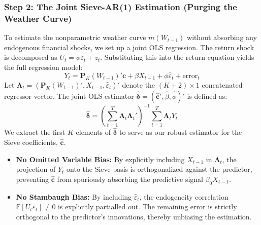 \documentclass{article}
\begin{document}
\subsubsection*{Step 2: The Joint Sieve-AR(1) Estimation (Purging the Weather Curve)}
To estimate the nonparametric weather curve $m(W_{t-1})$ without absorbing any endogenous financial shocks, we set up a joint OLS regression. The return shock is decomposed as $U_t = \phi \varepsilon_t + z_t$. Substituting this into the return equation yields the full regression model:
\begin{equation}
    Y_t = \bm{P}_K(W_{t-1})' \bm{c} + \beta X_{t-1} + \phi \widehat{\varepsilon}_t + \text{error}_t
\end{equation}
Let $\bm{\Lambda}_t = \left( \bm{P}_K(W_{t-1})', X_{t-1}, \widehat{\varepsilon}_t \right)'$ denote the $(K+2) \times 1$ concatenated regressor vector. The joint OLS estimator $\widehat{\bm{\delta}} = \left( \widehat{\bm{c}}', \widehat{\beta}, \widehat{\phi} \right)'$ is defined as:
\begin{equation}
    \widehat{\bm{\delta}} = \left( \sum_{t=1}^T \bm{\Lambda}_t \bm{\Lambda}_t' \right)^{-1} \sum_{t=1}^T \bm{\Lambda}_t Y_t
\end{equation}
We extract the first $K$ elements of $\widehat{\bm{\delta}}$ to serve as our robust estimator for the Sieve coefficients, $\widehat{\bm{c}}$. 
\begin{itemize}
    \item \textbf{No Omitted Variable Bias:} By explicitly including $X_{t-1}$ in $\bm{\Lambda}_t$, the projection of $Y_t$ onto the Sieve basis is orthogonalized against the predictor, preventing $\widehat{\bm{c}}$ from spuriously absorbing the predictive signal $\beta_0 X_{t-1}$.
    \item \textbf{No Stambaugh Bias:} By including $\widehat{\varepsilon}_t$, the endogeneity correlation $\mathbb{E}[U_t \varepsilon_t] \neq 0$ is explicitly partialled out. The remaining error is strictly orthogonal to the predictor's innovations, thereby unbiasing the estimation.
\end{itemize}
\end{document}
